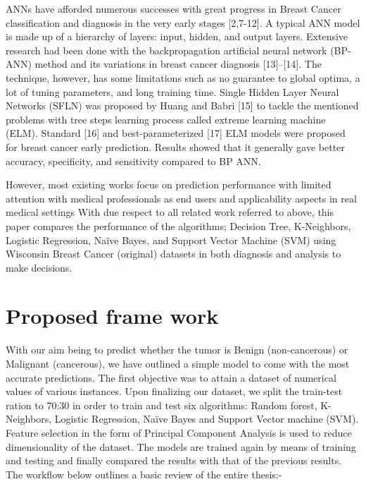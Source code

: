 \documentclass[conference]{IEEEtran}
\begin{document}
ANNs have afforded numerous successes with great progress in Breast Cancer classification and diagnosis in the very early stages [2,7-12]. A typical ANN model is made up of a hierarchy of layers: input, hidden, and output layers. Extensive research had been done with the backpropagation artificial neural network (BP-ANN) method and its variations in breast cancer diagnosis [13]–[14]. The technique, however, has some limitations such as no guarantee to global optima, a lot of tuning parameters, and long training time. Single Hidden Layer Neural Networks (SFLN) was proposed by Huang and Babri [15] to tackle the mentioned problems with tree steps learning process called extreme learning machine (ELM). Standard [16] and best-parameterized [17] ELM models were proposed for breast cancer early prediction. Results showed that it generally gave better accuracy, specificity, and sensitivity compared to BP ANN. 

However, most existing works focus on prediction performance with limited attention with medical professionals as end users and applicability aspects in real medical settings With due respect to all related work referred to above, this paper compares the performance of the algorithms; Decision Tree, K-Neighbors, Logistic Regression, Naïve Bayes, and Support Vector Machine (SVM) using Wisconsin Breast Cancer (original) datasets in both diagnosis and analysis to make decisions. 


\section{Proposed frame work}
With our aim being to predict whether the tumor is Benign (non-cancerous) or Malignant (cancerous), we have outlined a simple model to come with the most accurate predictions. The first objective was to attain a dataset of numerical values of various instances. Upon finalizing our dataset, we split the train-test ration to 70:30 in order to train and test six algorithms: Random forest, K-Neighbors, Logistic Regression, Naïve Bayes and Support Vector machine (SVM). Feature selection in the form of Principal Component Analysis is used to reduce dimensionality of the dataset. The models are trained again by means of training and testing  and finally compared the results with that of the previous results. The workflow below outlines a basic review of the entire thesis:-
\end{document}
